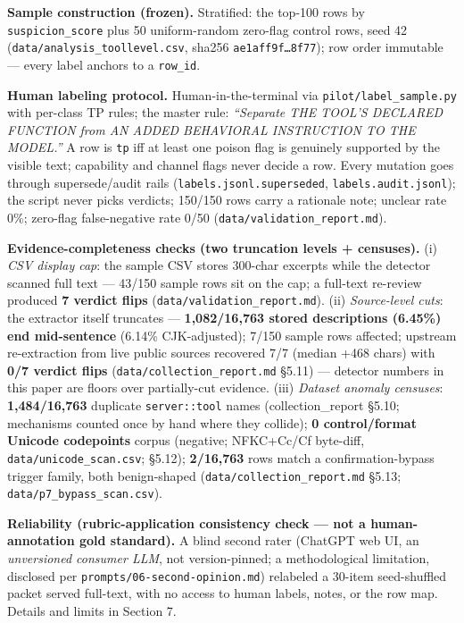 \documentclass[10pt,conference]{IEEEtran}
\begin{document}
\textbf{Sample construction (frozen).} Stratified: the top-100 rows by
\texttt{suspicion\_score} plus 50 uniform-random zero-flag control rows, seed 42
(\texttt{data/analysis\_toollevel.csv}, sha256
\texttt{ae1aff9f\ldots8f77}); row order immutable --- every label anchors to a
\texttt{row\_id}.

\textbf{Human labeling protocol.} Human-in-the-terminal via \texttt{pilot/label\_sample.py}
with per-class TP rules; the master rule: \emph{``Separate THE TOOL'S DECLARED FUNCTION
from AN ADDED BEHAVIORAL INSTRUCTION TO THE MODEL.''} A row is \texttt{tp} iff at least one
poison flag is genuinely supported by the visible text; capability and channel flags never
decide a row. Every mutation goes through supersede/audit rails
(\texttt{labels.jsonl.superseded}, \texttt{labels.audit.jsonl}); the script never picks
verdicts; 150/150 rows carry a rationale note; unclear rate 0\%; zero-flag
false-negative rate 0/50 (\texttt{data/validation\_report.md}).

\textbf{Evidence-completeness checks (two truncation levels + censuses).} (i) \emph{CSV
display cap}: the sample CSV stores 300-char excerpts while the detector scanned full text
--- 43/150 sample rows sit on the cap; a full-text re-review produced \textbf{7 verdict
flips} (\texttt{data/validation\_report.md}). (ii) \emph{Source-level cuts}: the extractor
itself truncates --- \textbf{1,082/16,763 stored descriptions (6.45\%) end mid-sentence}
(6.14\% CJK-adjusted); 7/150 sample rows affected; upstream re-extraction from live public
sources recovered 7/7 (median +468 chars) with \textbf{0/7 verdict flips}
(\texttt{data/collection\_report.md} \S5.11) --- detector numbers in this paper are floors
over partially-cut evidence. (iii) \emph{Dataset anomaly censuses}: \textbf{1,484/16,763}
duplicate \texttt{server::tool} names (collection\_report \S5.10; mechanisms counted once
by hand where they collide); \textbf{0 control/format Unicode codepoints} corpus (negative;
NFKC+Cc/Cf byte-diff, \texttt{data/unicode\_scan.csv}; \S5.12); \textbf{2/16,763} rows
match a confirmation-bypass trigger family, both benign-shaped
(\texttt{data/collection\_report.md} \S5.13; \texttt{data/p7\_bypass\_scan.csv}).

\textbf{Reliability (rubric-application consistency check --- not a human-annotation gold
standard).} A blind second rater (ChatGPT web UI, an \emph{unversioned consumer LLM}, not
version-pinned; a methodological limitation, disclosed per
\texttt{prompts/06-second-opinion.md}) relabeled a 30-item seed-shuffled packet served
full-text, with no access to human labels, notes, or the row map. Details and limits in
Section 7.
\end{document}

